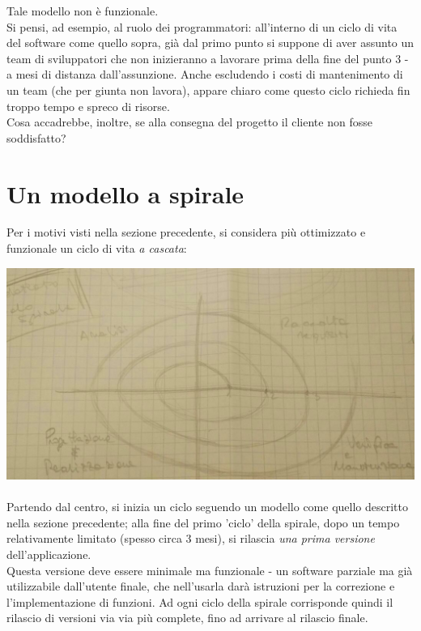 Tale modello non è funzionale.\\
Si pensi, ad esempio, al ruolo dei programmatori: all'interno di un ciclo di vita del software come quello sopra, già dal primo punto si suppone di aver assunto un team di sviluppatori che non inizieranno a lavorare prima della fine del punto 3 - a mesi di distanza dall'assunzione. Anche escludendo i costi di mantenimento di un team (che per giunta non lavora), appare chiaro come questo ciclo richieda fin troppo tempo e spreco di risorse.\\
Cosa accadrebbe, inoltre, se alla consegna del progetto il cliente non fosse soddisfatto?
\section{Un modello a spirale}
Per i motivi visti nella sezione precedente, si considera più ottimizzato e funzionale un ciclo di vita \textit{a cascata}:

\includegraphics[width=\textwidth]{spiral.jpg} \hfill \\ \\
Partendo dal centro, si inizia un ciclo seguendo un modello come quello descritto nella sezione precedente; alla fine del primo 'ciclo' della spirale, dopo un tempo relativamente limitato (spesso circa 3 mesi), si rilascia \textit{una prima \textit{}versione} dell'applicazione.\\
Questa versione deve essere minimale ma funzionale - un software parziale ma già utilizzabile dall'utente finale, che nell'usarla darà istruzioni per la correzione e l'implementazione di funzioni. Ad ogni ciclo della spirale corrisponde quindi il rilascio di versioni via via più complete, fino ad arrivare al rilascio finale.
